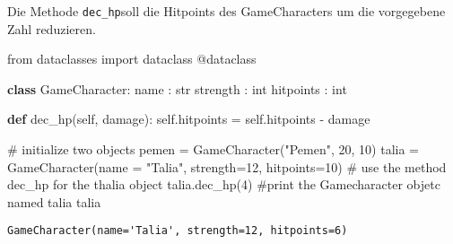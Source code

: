 \documentclass[
  11pt,
  a4paper,
  DIV=11,
  numbers=noendperiod]{scrartcl}
\newenvironment{Shaded}{\begin{snugshade}}{\end{snugshade}}
\newcommand{\AttributeTok}[1]{\textcolor[rgb]{0.40,0.45,0.13}{#1}}
\newcommand{\BuiltInTok}[1]{\textcolor[rgb]{0.00,0.23,0.31}{#1}}
\newcommand{\CommentTok}[1]{\textcolor[rgb]{0.37,0.37,0.37}{#1}}
\newcommand{\DecValTok}[1]{\textcolor[rgb]{0.68,0.00,0.00}{#1}}
\newcommand{\ImportTok}[1]{\textcolor[rgb]{0.00,0.46,0.62}{#1}}
\newcommand{\KeywordTok}[1]{\textcolor[rgb]{0.00,0.23,0.31}{\textbf{#1}}}
\newcommand{\NormalTok}[1]{\textcolor[rgb]{0.00,0.23,0.31}{#1}}
\newcommand{\OperatorTok}[1]{\textcolor[rgb]{0.37,0.37,0.37}{#1}}
\newcommand{\StringTok}[1]{\textcolor[rgb]{0.13,0.47,0.30}{#1}}
\newcommand{\VariableTok}[1]{\textcolor[rgb]{0.07,0.07,0.07}{#1}}
\begin{document}
Die Methode \texttt{dec\_hp}soll die Hitpoints des GameCharacters um die
vorgegebene Zahl reduzieren.

\begin{Shaded}
\begin{Highlighting}[numbers=left,,]
\ImportTok{from}\NormalTok{ dataclasses }\ImportTok{import}\NormalTok{ dataclass}
\AttributeTok{@dataclass}

\KeywordTok{class}\NormalTok{ GameCharacter:}
\NormalTok{    name : }\BuiltInTok{str}
\NormalTok{    strength : }\BuiltInTok{int}
\NormalTok{    hitpoints : }\BuiltInTok{int}
    
    \KeywordTok{def}\NormalTok{ dec\_hp(}\VariableTok{self}\NormalTok{, damage):}
        \VariableTok{self}\NormalTok{.hitpoints }\OperatorTok{=} \VariableTok{self}\NormalTok{.hitpoints }\OperatorTok{{-}}\NormalTok{ damage }
\end{Highlighting}
\end{Shaded}

\begin{Shaded}
\begin{Highlighting}[numbers=left,,]
\CommentTok{\# initialize two objects}
\NormalTok{pemen }\OperatorTok{=}\NormalTok{ GameCharacter(}\StringTok{"Pemen"}\NormalTok{, }\DecValTok{20}\NormalTok{, }\DecValTok{10}\NormalTok{)}
\NormalTok{talia }\OperatorTok{=}\NormalTok{ GameCharacter(name }\OperatorTok{=} \StringTok{"Talia"}\NormalTok{, strength}\OperatorTok{=}\DecValTok{12}\NormalTok{, hitpoints}\OperatorTok{=}\DecValTok{10}\NormalTok{)}
\CommentTok{\# use the method dec\_hp for the thalia object}
\NormalTok{talia.dec\_hp(}\DecValTok{4}\NormalTok{)}
\CommentTok{\#print the Gamecharacter objetc named talia}
\NormalTok{talia}
\end{Highlighting}
\end{Shaded}

\begin{verbatim}
GameCharacter(name='Talia', strength=12, hitpoints=6)
\end{verbatim}
\end{document}
